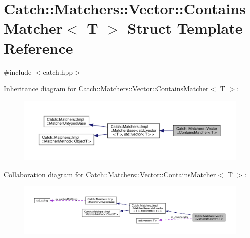\hypertarget{struct_catch_1_1_matchers_1_1_vector_1_1_contains_matcher}{}\section{Catch\+:\+:Matchers\+:\+:Vector\+:\+:Contains\+Matcher$<$ T $>$ Struct Template Reference}
\label{struct_catch_1_1_matchers_1_1_vector_1_1_contains_matcher}


{\ttfamily \#include $<$catch.\+hpp$>$}



Inheritance diagram for Catch\+:\+:Matchers\+:\+:Vector\+:\+:Contains\+Matcher$<$ T $>$\+:
\nopagebreak
\begin{figure}[H]
\begin{center}
\leavevmode
\includegraphics[width=350pt]{struct_catch_1_1_matchers_1_1_vector_1_1_contains_matcher__inherit__graph}
\end{center}
\end{figure}


Collaboration diagram for Catch\+:\+:Matchers\+:\+:Vector\+:\+:Contains\+Matcher$<$ T $>$\+:
\nopagebreak
\begin{figure}[H]
\begin{center}
\leavevmode
\includegraphics[width=350pt]{struct_catch_1_1_matchers_1_1_vector_1_1_contains_matcher__coll__graph}
\end{center}
\end{figure}
